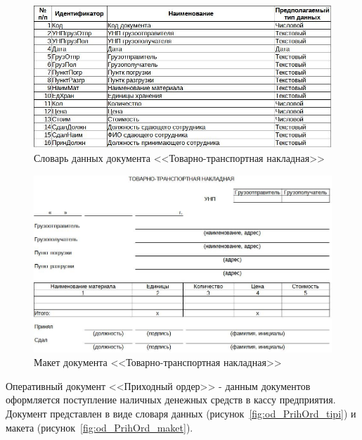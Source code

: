 \documentclass[12pt, a4paper, simple]{eskdtext}
\begin{document}
    \begin{figure}[!h]
        \centering
        \includegraphics[width=14cm]
            {_docs/ОП_ТТН_типы.jpg}
        \caption{Словарь данных документа <<Товарно-транспортная накладная>>}
        \label{fig:od_TTH_tipi}
    \end{figure}

    \begin{figure}[!h]
        \centering
        \includegraphics[width=14cm]
            {_docs/ОП_ТТН_макет.jpg}
        \caption{Макет документа <<Товарно-транспортная накладная>>}
        \label{fig:od_TTH_maket}
    \end{figure}

    \newpage

    Оперативный документ <<Приходный ордер>> - данным документов оформляется
    поступление наличных денежных средств в кассу предприятия.
    Документ представлен в виде словаря данных (рисунок~\ref{fig:od_PrihOrd_tipi})
    и макета (рисунок~\ref{fig:od_PrihOrd_maket}).
\end{document}
